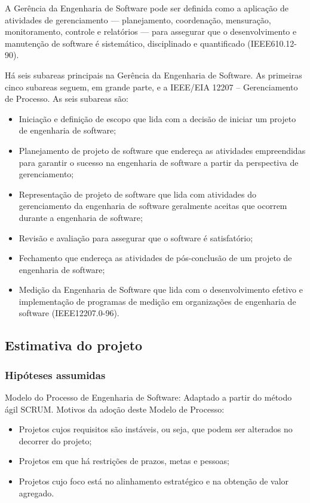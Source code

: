 A Gerência da Engenharia de Software pode ser definida como a aplicação de atividades de gerenciamento — planejamento, coordenação, mensuração, monitoramento, controle e relatórios — para assegurar que o desenvolvimento e manutenção de software é sistemático, disciplinado e quantificado (IEEE610.12-90).
 
Há seis subareas principais na Gerência da Engenharia de Software. As primeiras cinco subareas seguem, em grande parte, e a IEEE/EIA 12207 – Gerenciamento de Processo. As seis subareas são:  
 
 \begin{itemize}
\item Iniciação e definição de escopo que lida com a decisão de iniciar um projeto de engenharia de software;
\item Planejamento de projeto de software que endereça as atividades empreendidas para garantir o sucesso na engenharia de software a partir da perspectiva de gerenciamento;
\item Representação de projeto de software que lida com atividades do gerenciamento da engenharia de software geralmente aceitas que ocorrem durante a engenharia de software;
\item Revisão e avaliação para assegurar que o software é satisfatório;  
\item Fechamento que endereça as atividades de pós-conclusão de um projeto de engenharia de software;
\item Medição da Engenharia de Software que lida com o desenvolvimento efetivo e implementação de programas de medição em organizações de engenharia de software (IEEE12207.0-96).

\end{itemize}



\subsection{Estimativa do projeto}

\subsubsection{Hipóteses assumidas}

Modelo do Processo de Engenharia de Software: Adaptado a partir do método ágil SCRUM. Motivos da adoção deste Modelo de Processo:
 
 \begin{itemize}
\item Projetos cujos requisitos são instáveis, ou seja, que podem ser alterados no decorrer do projeto;
 
\item Projetos em que há restrições de prazos, metas e pessoas;
\item Projetos cujo foco está no alinhamento estratégico e na obtenção de valor agregado.
\end{itemize}

